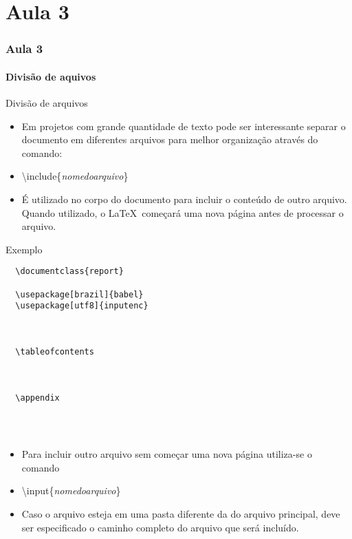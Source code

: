 \part{Aula 3}
\section{Aula 3}

\subsection{Divisão de aquivos}

\begin{frame}{Divisão de arquivos}

    \begin{itemize}
    \item Em projetos com grande quantidade de texto pode ser interessante separar o documento em diferentes arquivos para melhor organização através do comando:    
    \item[] \alert{\textbackslash include\{\textit{nomedoarquivo}\}}
    \item É utilizado no corpo do documento para incluir o conteúdo de outro arquivo. Quando utilizado, o \LaTeX\ começará uma nova página antes de processar o arquivo.
    \end{itemize}

    \begin{exampleblock}{Exemplo}
    {\footnotesize
\begin{verbatim}
  \documentclass{report}
  
  \usepackage[brazil]{babel}
  \usepackage[utf8]{inputenc}
  
  
  
  \tableofcontents
  
  
  
  \appendix
  
  
  
\end{verbatim}
    }
    \end{exampleblock}

    \newpage

    \begin{itemize}
    \item Para incluir outro arquivo sem começar uma nova página utiliza-se o comando
    \item[] \alert{\textbackslash input\{\textit{nomedoarquivo}\}}
    \item Caso o arquivo esteja em uma pasta diferente da do arquivo principal, deve ser especificado o caminho completo do arquivo que será incluído.
    \end{itemize}

\end{frame}
  
